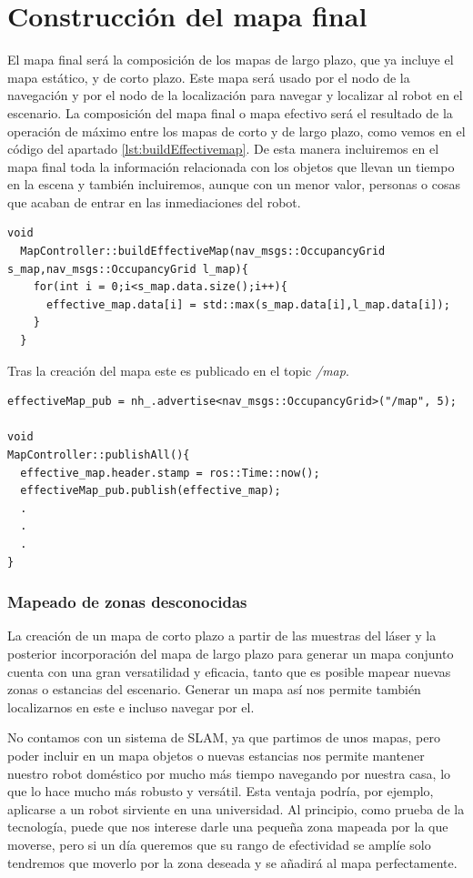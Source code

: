 \section{Construcción del mapa final}
\label{sec:construccionmap}
El mapa final será la composición de los mapas de largo plazo, que ya incluye el mapa estático, y de corto plazo. Este mapa será usado por el nodo de la navegación y por el nodo de la localización para navegar y localizar al robot en el escenario. La composición del mapa final o mapa efectivo será el resultado de la operación de máximo entre los mapas de corto y de largo plazo, como vemos en el código del apartado \ref{lst:buildEffectivemap}. De esta manera incluiremos en el mapa final toda la información relacionada con los objetos que llevan un tiempo en la escena y también incluiremos, aunque con un menor valor, personas o cosas que acaban de entrar en las inmediaciones del robot.
\pagebreak

\begin{lstlisting}[caption=Composición del mapa final, label={lst:buildEffectivemap}]
  void
  MapController::buildEffectiveMap(nav_msgs::OccupancyGrid s_map,nav_msgs::OccupancyGrid l_map){
    for(int i = 0;i<s_map.data.size();i++){
      effective_map.data[i] = std::max(s_map.data[i],l_map.data[i]);
    }
  }
\end{lstlisting}

Tras la creación del mapa este es publicado en el topic \textit{/map}. 

\begin{lstlisting}[caption=Publicación del mapa final, label={lst:effectivemappublish}]
effectiveMap_pub = nh_.advertise<nav_msgs::OccupancyGrid>("/map", 5);

void
MapController::publishAll(){
  effective_map.header.stamp = ros::Time::now();
  effectiveMap_pub.publish(effective_map);
  .
  .
  .
}
\end{lstlisting}


\subsubsection{Mapeado de zonas desconocidas}
La creación de un mapa de corto plazo a partir de las muestras del láser y la posterior incorporación del mapa de largo plazo para generar un mapa conjunto cuenta con una gran versatilidad y eficacia, tanto que es posible mapear nuevas zonas o estancias del escenario. Generar un mapa así nos permite también localizarnos en este e incluso navegar por el. 

No contamos con un sistema de SLAM, ya que partimos de unos mapas, pero poder incluir en un mapa objetos o nuevas estancias nos permite mantener nuestro robot doméstico por mucho más tiempo navegando por nuestra casa, lo que lo hace mucho más robusto y versátil. Esta ventaja podría, por ejemplo, aplicarse a un robot sirviente en una universidad. Al principio, como prueba de la tecnología, puede que nos interese darle una pequeña zona mapeada por la que moverse, pero si un día queremos que su rango de efectividad se amplíe solo tendremos que moverlo por la zona deseada y se añadirá al mapa perfectamente.


